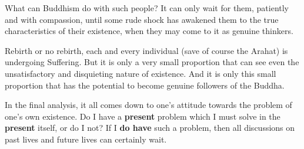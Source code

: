 What can Buddhism do with such people? It can only wait for them,
patiently and with compassion, until some rude shock has awakened them
to the true characteristics of their existence, when they may come to it
as genuine thinkers.


Rebirth or no rebirth, each and every individual (save of course the
Arahat) is undergoing Suffering. But it is only a very small proportion
that can see even the unsatisfactory and disquieting nature of
existence. And it is only this small proportion that has the potential
to become genuine followers of the Buddha.


In the final analysis, it all comes down to one’s attitude towards the
problem of one’s own existence. Do I have a \textbf{present} problem which I
must solve in the \textbf{present} itself, or do I not? If I \textbf{do have} such a
problem, then all discussions on past lives and future lives can
certainly wait.


